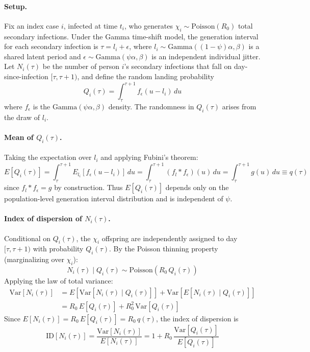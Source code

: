 \paragraph{Setup.}
Fix an index case $i$, infected at time $t_i$, who generates $\chi_i \sim \text{Poisson}(R_0)$ total secondary infections. Under the Gamma time-shift model, the generation interval for each secondary infection is $\tau = l_i + \epsilon$, where $l_i \sim \text{Gamma}((1-\psi)\alpha, \beta)$ is a shared latent period and $\epsilon \sim \text{Gamma}(\psi\alpha, \beta)$ is an independent individual jitter. Let $N_i(\tau)$ be the number of person $i$'s secondary infections that fall on day-since-infection $[\tau, \tau+1)$, and define the random landing probability
\begin{equation}
	Q_i(\tau) = \int_\tau^{\tau+1} f_\epsilon(u - l_i) \, du
\end{equation}
where $f_\epsilon$ is the $\text{Gamma}(\psi\alpha, \beta)$ density. The randomness in $Q_i(\tau)$ arises from the draw of $l_i$.

\paragraph{Mean of $Q_i(\tau)$.}
Taking the expectation over $l_i$ and applying Fubini's theorem:
\begin{equation}
	E[Q_i(\tau)] = \int_\tau^{\tau+1} E_{l_i}[f_\epsilon(u - l_i)] \, du = \int_\tau^{\tau+1} (f_l * f_\epsilon)(u) \, du = \int_\tau^{\tau+1} g(u) \, du \equiv q(\tau)
\end{equation}
since $f_l * f_\epsilon = g$ by construction. Thus $E[Q_i(\tau)]$ depends only on the population-level generation interval distribution and is independent of $\psi$.

\paragraph{Index of dispersion of $N_i(\tau)$.}
Conditional on $Q_i(\tau)$, the $\chi_i$ offspring are independently assigned to day $[\tau, \tau+1)$ with probability $Q_i(\tau)$. By the Poisson thinning property (marginalizing over $\chi_i$):
\begin{equation}
	N_i(\tau) \mid Q_i(\tau) \sim \text{Poisson}(R_0 \, Q_i(\tau))
\end{equation}
Applying the law of total variance:
\begin{align}
	\text{Var}[N_i(\tau)] &= E[\text{Var}[N_i(\tau) \mid Q_i(\tau)]] + \text{Var}[E[N_i(\tau) \mid Q_i(\tau)]] \nonumber \\
	&= R_0 \, E[Q_i(\tau)] + R_0^2 \, \text{Var}[Q_i(\tau)]
\end{align}
Since $E[N_i(\tau)] = R_0 \, E[Q_i(\tau)] = R_0 \, q(\tau)$, the index of dispersion is
\begin{equation}
	\text{ID}[N_i(\tau)] = \frac{\text{Var}[N_i(\tau)]}{E[N_i(\tau)]} = 1 + R_0 \, \frac{\text{Var}[Q_i(\tau)]}{E[Q_i(\tau)]}
	\label{eq:ID_individual}
\end{equation}

